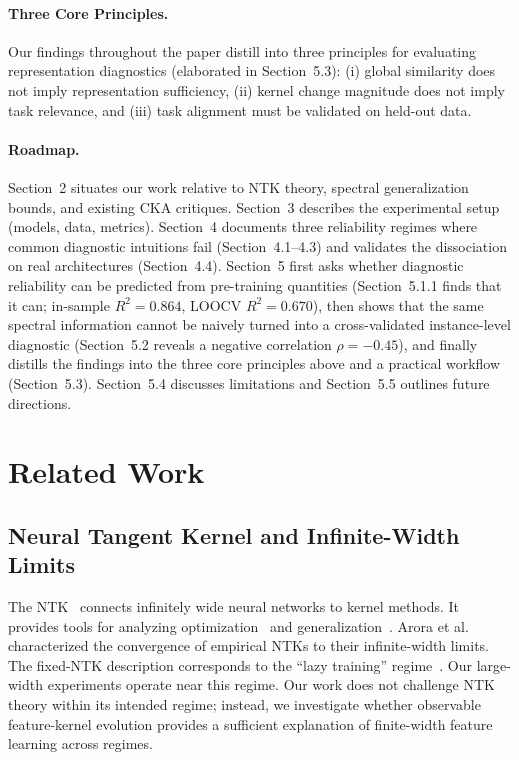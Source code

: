 \documentclass[10pt]{article}
\begin{document}
\paragraph{Three Core Principles.}
Our findings throughout the paper distill into three principles for evaluating representation diagnostics (elaborated in Section~5.3): (i) global similarity does not imply representation sufficiency, (ii) kernel change magnitude does not imply task relevance, and (iii) task alignment must be validated on held-out data.

\paragraph{Roadmap.}
Section~2 situates our work relative to NTK theory, spectral generalization bounds, and existing CKA critiques. Section~3 describes the experimental setup (models, data, metrics). Section~4 documents three reliability regimes where common diagnostic intuitions fail (Section~4.1--4.3) and validates the dissociation on real architectures (Section~4.4). Section~5 first asks whether diagnostic reliability can be predicted from pre-training quantities (Section~5.1.1 finds that it can; in-sample $R^2=0.864$, LOOCV $R^2=0.670$), then shows that the same spectral information cannot be naively turned into a cross-validated instance-level diagnostic (Section~5.2 reveals a negative correlation $\rho=-0.45$), and finally distills the findings into the three core principles above and a practical workflow (Section~5.3). Section~5.4 discusses limitations and Section~5.5 outlines future directions.

\section{Related Work}
\label{sec:related}

\subsection{Neural Tangent Kernel and Infinite-Width Limits}
The NTK~\citep{jacot2018neural} connects infinitely wide neural networks to kernel methods. It provides tools for analyzing optimization~\citep{du2019neural,allen2019learning} and generalization~\citep{arora2019exact}.  Arora et al.~\cite{arora2019exact} characterized the convergence of empirical NTKs to their infinite-width limits.  The fixed-NTK description corresponds to the ``lazy training'' regime~\citep{chizat2020lazy}.  Our large-width experiments operate near this regime.  Our work does not challenge NTK theory within its intended regime; instead, we investigate whether observable feature-kernel evolution provides a sufficient explanation of finite-width feature learning across regimes.
\end{document}
